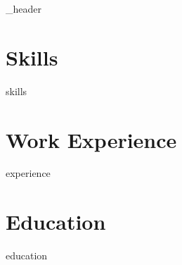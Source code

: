 \documentclass[letter,10pt]{article}
\author{Vladyslav Kalashnyk}
\begin{document}
{_header}

\section{Skills}
{skills}

\section{Work Experience}
{experience}

\section{Education}
{education}
\end{document}
